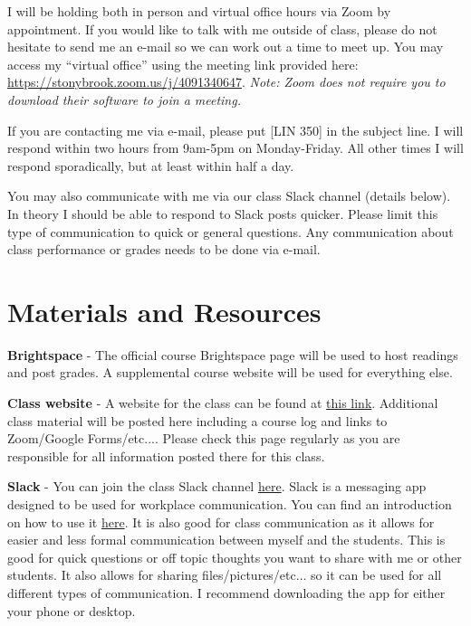 \documentclass[11pt]{article}
\begin{document}
I will be holding both in person and virtual office hours via Zoom by appointment. 
If you would like to talk with me outside of class, please do not hesitate to send me an e-mail so we can work out a time to meet up. 
You may access my ``virtual office'' using the meeting link provided here: \href{https://stonybrook.zoom.us/j/4091340647}{https://stonybrook.zoom.us/j/4091340647}. 
\textit{Note: Zoom does not require you to download their software to join a meeting.}
\vspace{.25cm}

If you are contacting me via e-mail, please put [LIN 350] in the subject line. I will respond within two hours from 9am-5pm on Monday-Friday. All other times I will respond sporadically, but at least within half a day.  

You may also communicate with me via our class Slack channel (details below). In theory I should be able to respond to Slack posts quicker. Please limit this type of communication to quick or general questions. Any communication about class performance or grades needs to be done via e-mail.

\section*{Materials and Resources}

\textbf{Brightspace} - The official course Brightspace page will be used to host readings and post grades. A supplemental course website will be used for everything else.

\textbf{Class website} - A website for the class can be found at \href{https://snelson89.bitbucket.io/350SU2023.html}{this link}. Additional class material will be posted here including a course log and links to Zoom/Google Forms/etc.... Please check this page regularly as you are responsible for all information posted there for this class.

\textbf{Slack} - You can join the class Slack channel \href{https://join.slack.com/t/lin350summer2023/shared_invite/zt-1wlogdm2b-JtDb~jPe89ky1jLfmbZeUg}{here}. Slack is a messaging app designed to be used for workplace communication. You can find an introduction on how to use it \href{https://slack.global.ssl.fastly.net/0cc2/pdfs/users_guide.pdf?fbclid=IwAR0IRj8DYxytM76m_j44wgg9-OWUmFMKfxLXfCM2Iv7qVyWP-5ZBo_T7Gsw}{here}. It is also good for class communication as it allows for easier and less formal communication between myself and the students. This is good for quick questions or off topic thoughts you want to share with me or other students. It also allows for sharing files/pictures/etc... so it can be used for all different types of communication. I recommend downloading the app for either your phone or desktop.
\end{document}
